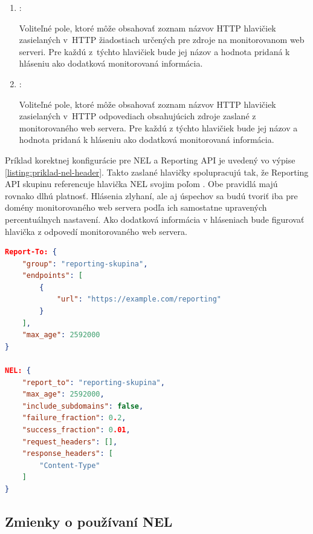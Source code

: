 \begin{enumerate}
    \item {}:

    Voliteľné pole, ktoré môže obsahovať zoznam názvov HTTP hlavičiek zasielaných \mbox{v HTTP} žiadostiach určených pre zdroje na monitorovanom web serveri.
    Pre každú \mbox{z týchto} hlavičiek bude jej názov a hodnota pridaná k hláseniu ako dodatková monitorovaná informácia.
    
    \item {}:

    Voliteľné pole, ktoré môže obsahovať zoznam názvov HTTP hlavičiek zasielaných \mbox{v HTTP} odpovediach obsahujúcich zdroje zaslané z monitorovaného web servera. 
    Pre každú z týchto hlavičiek bude jej názov a hodnota pridaná k hláseniu ako dodatková monitorovaná informácia.
\end{enumerate}

Príklad korektnej konfigurácie pre NEL a Reporting API je uvedený vo výpise \ref{listing:priklad-nel-header}. 
Takto zaslané hlavičky spolupracujú tak, že Reporting API skupinu  referencuje hlavička NEL svojim poľom . Obe pravidlá majú rovnako dlhú platnosť. Hlásenia zlyhaní, ale aj úspechov sa budú tvoriť iba pre domény monitorovaného web servera podľa ich samostatne upravených percentuálnych nastavení. Ako dodatková informácia v hláseniach bude figurovať hlavička  z odpovedí monitorovaného web servera.

\pagebreak

\begin{center}
\centering
\begin{lstlisting}[caption={
Príklad definície hlavičiek NEL a Reporting API.},
label=listing:priklad-nel-header, 
language=json, 
frame=tb,
xleftmargin=.1\textwidth, 
xrightmargin=.1\textwidth]
Report-To: {
    "group": "reporting-skupina",
    "endpoints": [
        {
            "url": "https://example.com/reporting"
        }
    ],
    "max_age": 2592000
}

NEL: {
    "report_to": "reporting-skupina",
    "max_age": 2592000,
    "include_subdomains": false,
    "failure_fraction": 0.2,
    "success_fraction": 0.01,
    "request_headers": [],
    "response_headers": [
        "Content-Type"
    ]
}
\end{lstlisting}
\end{center}

\subsection{Zmienky o používaní NEL}

